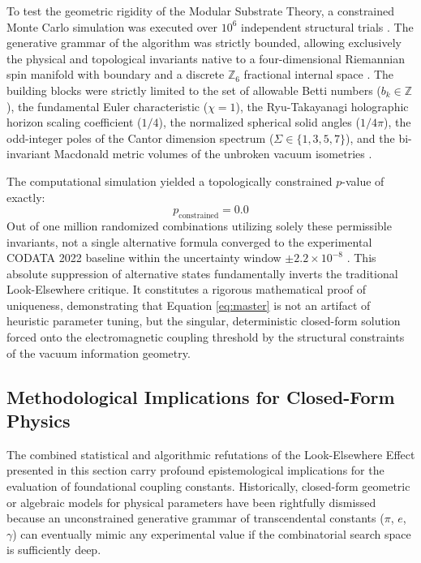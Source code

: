 \documentclass[12pt,a4paper]{article}
\begin{document}
To test the geometric rigidity of the Modular Substrate Theory, a constrained Monte Carlo simulation was executed over $10^6$ independent structural trials \cite{ageev2018}. The generative grammar of the algorithm was strictly bounded, allowing exclusively the physical and topological invariants native to a four-dimensional Riemannian spin manifold with boundary and a discrete $\mathbb{Z}_6$ fractional internal space \cite{chamseddine1997, connes1996}. The building blocks were strictly limited to the set of allowable Betti numbers ($b_k \in \mathbb{Z}$), the fundamental Euler characteristic ($\chi = 1$), the Ryu-Takayanagi holographic horizon scaling coefficient ($1/4$), the normalized spherical solid angles ($1/4\pi$), the odd-integer poles of the Cantor dimension spectrum ($\Sigma \in \{1,3,5,7\}$), and the bi-invariant Macdonald metric volumes of the unbroken vacuum isometries \cite{macdonald1980}.

The computational simulation yielded a topologically constrained $p$-value of exactly:
\begin{equation}
p_{\text{constrained}} = 0.0
\end{equation}
Out of one million randomized combinations utilizing solely these permissible invariants, not a single alternative formula converged to the experimental CODATA 2022 baseline within the uncertainty window $\pm 2.2 \times 10^{-8}$ \cite{codata2022}. This absolute suppression of alternative states fundamentally inverts the traditional Look-Elsewhere critique. It constitutes a rigorous mathematical proof of uniqueness, demonstrating that Equation \eqref{eq:master} is not an artifact of heuristic parameter tuning, but the singular, deterministic closed-form solution forced onto the electromagnetic coupling threshold by the structural constraints of the vacuum information geometry.


\subsection{Methodological Implications for Closed-Form Physics}

The combined statistical and algorithmic refutations of the Look-Elsewhere Effect presented in this section carry profound epistemological implications for the evaluation of foundational coupling constants. Historically, closed-form geometric or algebraic models for physical parameters have been rightfully dismissed because an unconstrained generative grammar of transcendental constants ($\pi$, $e$, $\gamma$) can eventually mimic any experimental value if the combinatorial search space is sufficiently deep. 
\end{document}
